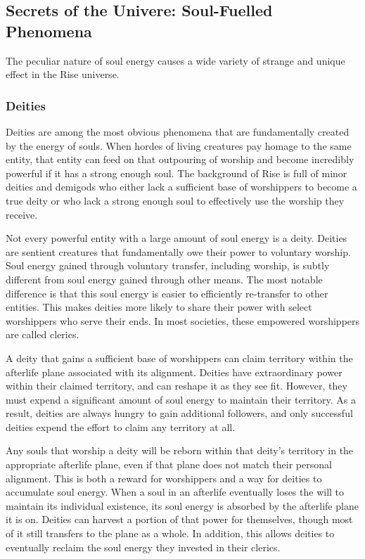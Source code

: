    \subsection{Secrets of the Univere: Soul-Fuelled Phenomena}

        The peculiar nature of soul energy causes a wide variety of strange and unique effect in the Rise universe.

        \subsubsection{Deities}
            Deities are among the most obvious phenomena that are fundamentally created by the energy of souls.
            When hordes of living creatures pay homage to the same entity, that entity can feed on that outpouring of worship and become incredibly powerful if it has a strong enough soul.
            The background of Rise is full of minor deities and demigods who either lack a sufficient base of worshippers to become a true deity or who lack a strong enough soul to effectively use the worship they receive.

            Not every powerful entity with a large amount of soul energy is a deity.
            Deities are sentient creatures that fundamentally owe their power to voluntary worship.
            Soul energy gained through voluntary transfer, including worship, is subtly different from soul energy gained through other means.
            The most notable difference is that this soul energy is easier to efficiently re-transfer to other entities.
            This makes deities more likely to share their power with select worshippers who serve their ends.
            In most societies, these empowered worshippers are called clerics.

            A deity that gains a sufficient base of worshippers can claim territory within the afterlife plane associated with its alignment.
            Deities have extraordinary power within their claimed territory, and can reshape it as they see fit.
            However, they must expend a significant amount of soul energy to maintain their territory.
            As a result, deities are always hungry to gain additional followers, and only successful deities expend the effort to claim any territory at all.

            Any souls that worship a deity will be reborn within that deity's territory in the appropriate afterlife plane, even if that plane does not match their personal alignment.
            This is both a reward for worshippers and a way for deities to accumulate soul energy.
            When a soul in an afterlife eventually loses the will to maintain its individual existence, its soul energy is absorbed by the afterlife plane it is on.
            Deities can harvest a portion of that power for themselves, though most of it still transfers to the plane as a whole.
            In addition, this allows deities to eventually reclaim the soul energy they invested in their clerics.

